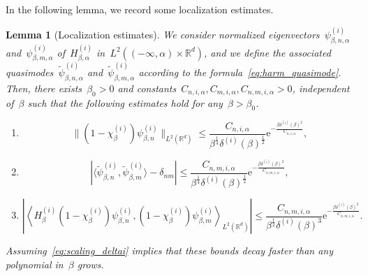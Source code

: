\documentclass[10pt]{article}
\newcommand{\e}{\mathrm{e}}
\newcommand{\R}{\mathbb{R}}
\newcommand{\1}{\mathbbm 1}
\newcommand{\deltai}{\delta^{(i)}}
\newtheorem{lemma}{Lemma}
\begin{document}
    In the following lemma, we record some localization estimates.
    \begin{lemma}[Localization estimates]
        \label{lemma:localization}
        We consider normalized eigenvectors~$\psi_{\beta,n,\alpha}^{(i)}$ and~$\psi_{\beta,m,\alpha}^{(i)}$ of~$H^{(i)}_{\beta,\alpha}$ in~$L^2((-\infty,\alpha)\times \R^d)$, and we define the associated quasimodes~$\widetilde\psi_{\beta,n,\alpha}^{(i)}$ and~$\widetilde\psi_{\beta,m,\alpha}^{(i)}$ according to the formula~\eqref{eq:harm_quasimode}.
        Then, there exists~$\beta_0>0$ and constants~$C_{n,i,\alpha},C_{m,i,\alpha},C_{n,m,i,\alpha}>0$, independent of~$\beta$ such that the following estimates hold for any~$\beta>\beta_0$.
        \begin{enumerate}[]
            \item{\begin{equation}\label{eq:loc_eqa}\|(1-\chi_\beta^{(i)})\psi_{\beta,n}^{(i)}\|_{L^2(\R^d)} \leq \frac{C_{n,i,\alpha}}{\beta^{\frac14}\deltai(\beta)^{\frac12}}\e^{-\frac{\beta\deltai(\beta)^2}{C_{n,i,\alpha}}},\end{equation}}
            \item{\begin{equation}\label{eq:loc_eqb}\left|\langle \widetilde\psi_{\beta,n}^{(i)},\widetilde\psi_{\beta,m}^{(i)}\rangle-\delta_{nm}\right| \leq  \frac{C_{n,m,i,\alpha}}{\beta^{\frac14}\deltai(\beta)^{\frac12}}\e^{-\frac{\beta\deltai(\beta)^2}{C_{n,m,i,\alpha}}},\end{equation}}
            \item{\begin{equation}\label{eq:loc_eqc}\left|\left\langle H_\beta^{(i)}(1-\chi_\beta^{(i)})\psi_{\beta,n}^{(i)},(1-\chi_\beta^{(i)})\psi_{\beta,m}^{(i)}\right\rangle_{L^2(\R^d)}\right|\leq \frac{C_{n,m,i,\alpha}}{\beta^{\frac12}\deltai(\beta)^{3}}\e^{-\frac{\beta\deltai(\beta)^2}{C_{n,m,i,\alpha}}}.\end{equation}}
        \end{enumerate}
        
        Assuming~\eqref{eq:scaling_deltai} implies that these bounds decay faster than any polynomial in~$\beta$ grows.
    \end{lemma}
\end{document}
